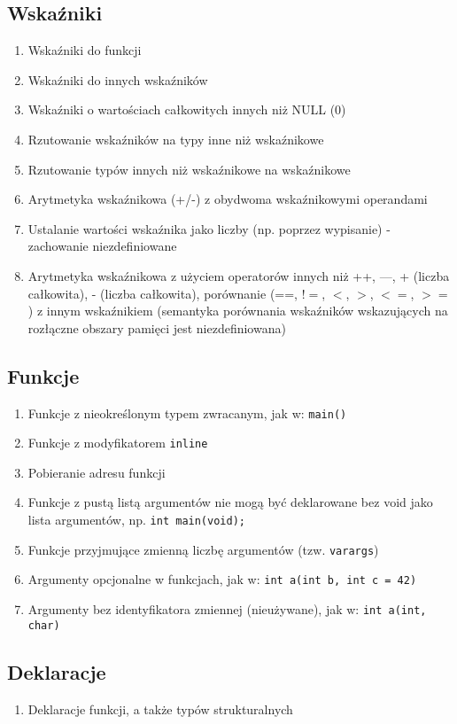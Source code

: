 \documentclass[a4paper,twoside,openright,11pt]{report}
\begin{document}
  \subsection {Wskaźniki}
    \begin{enumerate}
      \item Wskaźniki do funkcji
      \item Wskaźniki do innych wskaźników
      \item Wskaźniki o wartościach całkowitych innych niż NULL (0)
      \item Rzutowanie wskaźników na typy inne niż wskaźnikowe
      \item Rzutowanie typów innych niż wskaźnikowe na wskaźnikowe
      \item Arytmetyka wskaźnikowa (+/-) z obydwoma wskaźnikowymi operandami
      \item Ustalanie wartości wskaźnika jako liczby (np. poprzez wypisanie) - zachowanie niezdefiniowane
      \item Arytmetyka wskaźnikowa z użyciem operatorów innych niż ++, —, + (liczba całkowita), - (liczba całkowita), porównanie (==, !$=$, $<$, $>$, $<=$, $>=$) z innym wskaźnikiem (semantyka porównania wskaźników wskazujących na rozłączne obszary pamięci jest niezdefiniowana)
    \end{enumerate}
  \subsection {Funkcje}
    \begin{enumerate}
      \item Funkcje z nieokreślonym typem zwracanym, jak w: \texttt{main()} { }
      \item Funkcje z modyfikatorem \texttt{inline}
      \item Pobieranie adresu funkcji
      \item Funkcje z pustą listą argumentów nie mogą być deklarowane bez void jako lista argumentów, np. \texttt{int main(void);}
      \item Funkcje przyjmujące zmienną liczbę argumentów (tzw. \texttt{varargs})
      \item Argumenty opcjonalne w funkcjach, jak w: \texttt{int a(int b, int c = 42)} { }
      \item Argumenty bez identyfikatora zmiennej (nieużywane), jak w: \texttt{int a(int, char)} { }
    \end{enumerate}
  \subsection {Deklaracje}
    \begin{enumerate}
      \item Deklaracje funkcji, a także typów strukturalnych 
    \end{enumerate}
\end{document}
